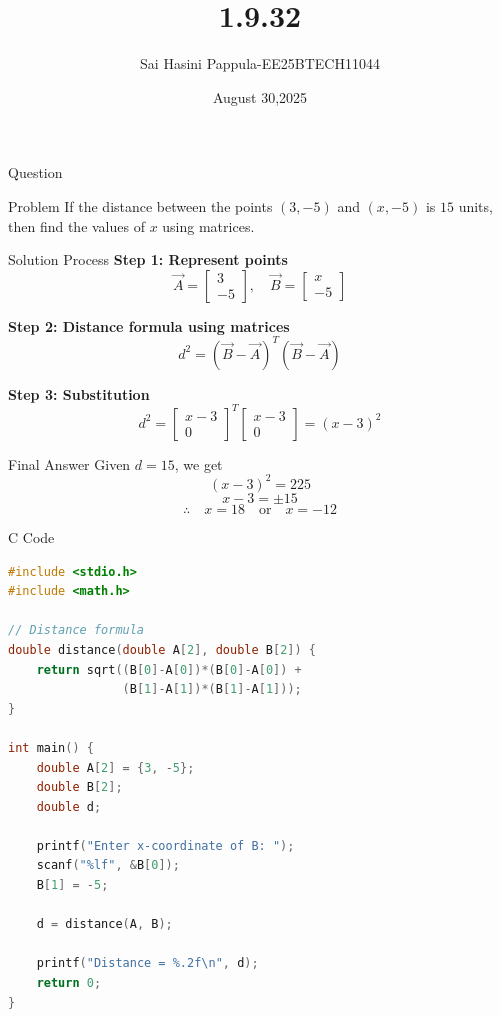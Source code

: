 \documentclass{beamer}
\title %
{1.9.32}
\date{August 30,2025}
\author %
{Sai Hasini Pappula-EE25BTECH11044}
\begin{document}
\begin{frame}{Question}
\begin{block}{Problem}
If the distance between the points $(3,-5)$ and $(x,-5)$ is $15$ units, then find the values of $x$ using matrices.
\end{block}
\end{frame}

\begin{frame}{Solution Process}
\textbf{Step 1: Represent points}\\[4pt]
\[
\vec{A} = \begin{bmatrix} 3 \\ -5 \end{bmatrix}, 
\quad 
\vec{B} = \begin{bmatrix} x \\ -5 \end{bmatrix}
\]

\textbf{Step 2: Distance formula using matrices}\\[4pt]
\[
d^2 = (\vec{B}-\vec{A})^T(\vec{B}-\vec{A})
\]

\textbf{Step 3: Substitution}\\[4pt]
\[
d^2 = \begin{bmatrix} x-3 \\ 0 \end{bmatrix}^T 
       \begin{bmatrix} x-3 \\ 0 \end{bmatrix} 
     = (x-3)^2
\]
\end{frame}

\begin{frame}{Final Answer}
Given $d=15$, we get
\[
(x-3)^2 = 225
\]
\[
x-3 = \pm 15
\]
\[
\therefore \quad x = 18 \quad \text{or} \quad x = -12
\]
\end{frame}

\begin{frame}[fragile]{C Code}
\begin{lstlisting}[language=C]
#include <stdio.h>
#include <math.h>

// Distance formula
double distance(double A[2], double B[2]) {
    return sqrt((B[0]-A[0])*(B[0]-A[0]) +
                (B[1]-A[1])*(B[1]-A[1]));
}

int main() {
    double A[2] = {3, -5};
    double B[2];
    double d;

    printf("Enter x-coordinate of B: ");
    scanf("%lf", &B[0]);
    B[1] = -5;

    d = distance(A, B);

    printf("Distance = %.2f\n", d);
    return 0;
}
\end{lstlisting}
\end{frame}
\end{document}
